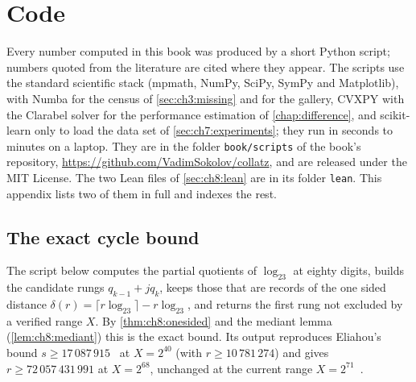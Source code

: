 \chapter{Code}\label{app:code}

Every number computed in this book was produced by a short Python script; numbers quoted from the literature are cited where they appear.
The scripts use the standard scientific stack (mpmath, NumPy, SciPy, SymPy and Matplotlib), with Numba for the census of \cref{sec:ch3:missing} and for the gallery, CVXPY with the Clarabel solver for the performance estimation of \cref{chap:difference}, and scikit-learn only to load the data set of \cref{sec:ch7:experiments}; they run in seconds to minutes on a laptop.
They are in the folder \texttt{book/scripts} of the book's repository, \url{https://github.com/VadimSokolov/collatz}, and are released under the MIT License.
The two Lean files of \cref{sec:ch8:lean} are in its folder \texttt{lean}.
This appendix lists two of them in full and indexes the rest.

\section{The exact cycle bound}

The script below computes the partial quotients of $\log_23$ at eighty digits,
builds the candidate rungs $q_{k-1}+jq_k$, keeps those that are records of the
one sided distance $\delta(r)=\lceil r\log_23\rceil-r\log_23$, and returns the
first rung not excluded by a verified range $X$.
By \cref{thm:ch8:onesided} and the mediant lemma (\cref{lem:ch8:mediant}) this is the exact bound.
Its output reproduces Eliahou's bound $s\ge17\,087\,915$~\cite{eliahou1993} at $X=2^{40}$ (with $r\ge10\,781\,274$) and gives $r\ge72\,057\,431\,991$ at $X=2^{68}$, unchanged at the current range $X=2^{71}$~\cite{barina2025}.

